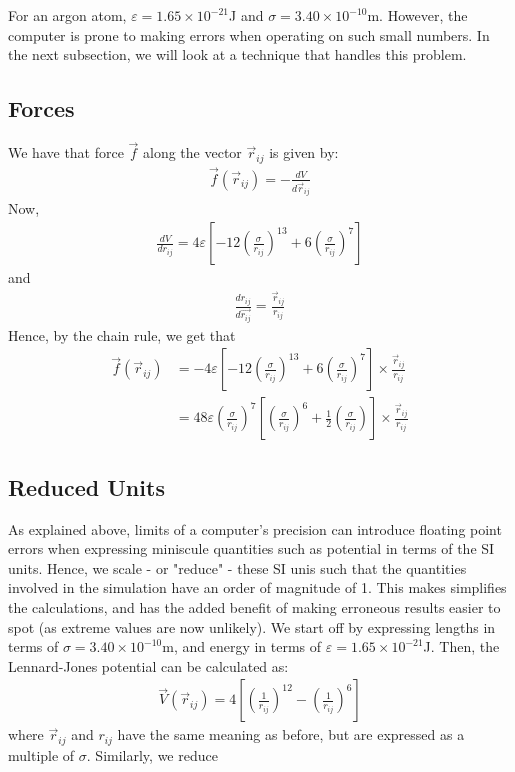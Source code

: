 \documentclass[../Main.tex]{subfiles}
\begin{document}
For an argon atom, $\varepsilon = 1.65 \times 10^{-21}$J and $\sigma = 3.40 \times 10^{-10}$m. However, the computer is prone to making errors when operating on such small numbers. In the next subsection, we will look at a technique that handles this problem.

\subsection{Forces}

We have that force $\vec{f}$ along the vector $\vec{r}_{ij}$ is given by:
\begin{align*}
\vec{f}\left(\vec{r}_{ij}\right) = -\frac{dV}{d\vec{r}_{ij}}
\end{align*}
Now,
\begin{align*}
\frac{dV}{dr_{ij}} = 4\varepsilon \left[ -12\left( \frac{\sigma}{r_{ij}}\right)^13 + 6\left( \frac{\sigma}{r_{ij}}\right)^7\right]
\end{align*}
and
\begin{align*}
\frac{dr_{ij}}{d\vec{r_{ij}}} = \frac{\vec{r}_{ij}}{r_{ij}}
\end{align*}
Hence, by the chain rule, we get that
\begin{align}
\vec{f}\left(\vec{r}_{ij}\right) & = -4\varepsilon \left[ -12\left( \frac{\sigma}{r_{ij}}\right)^13 + 6\left( \frac{\sigma}{r_{ij}}\right)^7\right] \times \frac{\vec{r}_{ij}}{r_{ij}} \nonumber \\
& = 48\varepsilon \left( \frac{\sigma}{r_{ij}}\right)^7 \left[ \left( \frac{\sigma}{r_{ij}}\right)^6 + \frac{1}{2}\left( \frac{\sigma}{r_{ij}}\right)\right] \times \frac{\vec{r}_{ij}}{r_{ij}} \label{eqn:lennard-jones_one_atom_force}
\end{align}

\subsection{Reduced Units}

As explained above, limits of a computer's precision can introduce floating point errors when expressing miniscule quantities such as potential in terms of the SI units. Hence, we scale - or "reduce" - these SI unis such that the quantities involved in the simulation have an order of magnitude of 1. This makes simplifies the calculations, and has the added benefit of making erroneous results easier to spot (as extreme values are now unlikely). We start off by expressing lengths in terms of $\sigma = 3.40 \times 10^{-10}$m, and energy in terms of $\varepsilon = 1.65 \times 10^{-21}$J. Then, the Lennard-Jones potential can be calculated as:
\begin{align}
	\vec{V}\left(\vec{r}_{ij}\right) = 4 \left[ \left( \frac{1}{r_{ij}}\right)^{12} - \left( \frac{1}{r_{ij}}\right)^6 \right] \label{eqn:lennard-jones_potential_reduced}
\end{align}
where $\vec{r}_{ij}$ and $r_{ij}$ have the same meaning as before, but are expressed as a multiple of $\sigma$.
Similarly, we reduce 
\end{document}

